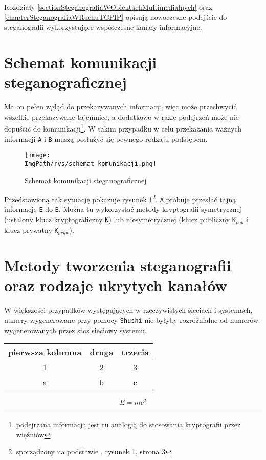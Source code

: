 \documentclass[a4paper,12pt,twoside,openany]{report}
\newcommand{\ImgPath}{.}
\newcommand{\tech}{\texttt}
\begin{document}
Rozdziały \ref{sectionSteganografiaWObiektachMultimedialnych} oraz 
\ref{chapterSteganografiaWRuchuTCPIP} opisują nowoczesne podejście do 
steganografii wykorzystujące współczesne kanały informacyjne. 
\section{Schemat komunikacji steganograficznej}
\label{sectionSchematKomunikacjiSteganograficznej}
 Ma on pełen wgląd do przekazywanych 
informacji, więc może przechwycić wszelkie przekazywane tajemnice, a dodatkowo w 
razie podejrzeń może nie dopuścić do komunikacji\footnote{podejrzana informacja 
jest tu analogią do stosowania kryptografii przez więźniów}. W takim przypadku w 
celu przekazania ważnych informacji \tech{A} i \tech{B} muszą posłużyć się 
pewnego rodzaju podstępem. 
\begin{figure}[!htbp]
	\begin{center}
\centering
\texttt{[image: \\ImgPath/rys/schemat\_komunikacji.png]}
\end{center}
	\caption{Schemat komunikacji steganograficznej}
	\label{schematKomunikacji}
\end{figure}

Przedstawioną tak sytuację pokazuje rysunek 
\ref{schematKomunikacji}\footnote{sporządzony na podstawie 
\cite{schematKomunikacjiPrzypis}, rysunek 1, strona 3}. \tech{A} próbuje 
przesłać tajną informację \tech{E} do \tech{B}. Można tu wykorzystać metody kryptografii symetrycznej (ustalony 
klucz kryptograficzny \tech{K}) lub niesymetrycznej (klucz publiczny 
\tech{K}$_{pub}$ i klucz prywatny \tech{K}$_{pryw}$).

\section{Metody tworzenia steganografii oraz rodzaje ukrytych kanałów}
 W większości przypadków występujących w rzeczywistych sieciach i 
systemach, numery wygenerowane przy pomocy \tech{Shushi} nie byłyby rozróżnialne 
od numerów wygenerowanych przez stos sieciowy systemu.

\begin{tabular}{c|cc}
pierwsza kolumna & druga & trzecia \\ \hline
1 & 2 & 3 \\
a & b & c \\
\end{tabular} 

\begin{equation}
 E = m c^2 \label{einstein}
\end{equation}
\end{document}
